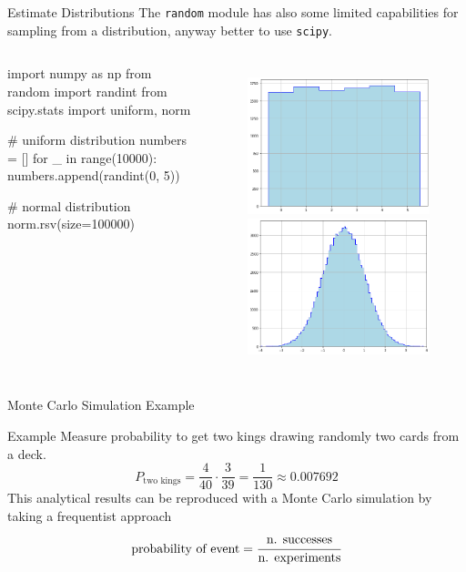 \documentclass{beamer}
\begin{document}
\begin{frame}[fragile]{Estimate Distributions}
The \texttt{random} module has also some limited capabilities for sampling from a distribution, anyway 
better to use \texttt{scipy}.

\begin{columns}
\begin{ipython}
import numpy as np
from random import randint
from scipy.stats import uniform, norm

# uniform distribution
numbers = []
for _ in range(10000):
    numbers.append(randint(0, 5))

# normal distribution
norm.rsv(size=100000)   
\end{ipython}
\begin{figure}[h]
    \begin{center}
    \includegraphics[width=0.55\linewidth]{uniform_distro}\\
    \includegraphics[width=0.55\linewidth]{gauss_distro}
    \end{center}
\end{figure}    
\end{columns}
\end{frame}

\begin{frame}{Monte Carlo Simulation Example}
\begin{block}{Example}
Measure probability to get two kings drawing randomly two cards from a deck.
\begin{equation*}
P_{\textrm{two kings}} = \frac{4}{40} \cdot \frac{3}{39} = \frac{1}{130} \approx 0.007692
\end{equation*}
This analytical results can be reproduced with a Monte Carlo simulation by taking a frequentist approach
\begin{equation*}
\textrm{probability of event} = \cfrac{\textrm{n. successes}}{\textrm{n. experiments}}
\end{equation*}
\end{block}
\end{frame}
\end{document}
